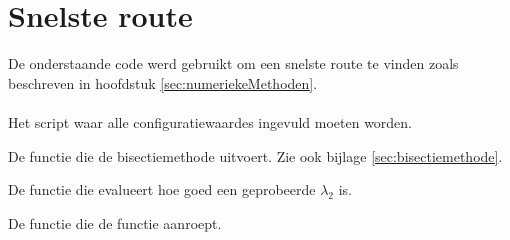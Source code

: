 \section{Snelste route}
De onderstaande code werd gebruikt om een snelste route te vinden zoals beschreven in hoofdstuk \ref{sec:numeriekeMethoden}.\\
\\
Het script waar alle configuratiewaardes ingevuld moeten worden.


De functie die de bisectiemethode uitvoert. Zie ook bijlage \ref{sec:bisectiemethode}.


De functie die evalueert hoe goed een geprobeerde \(\lambda_2\) is.


De functie die de  functie aanroept.


